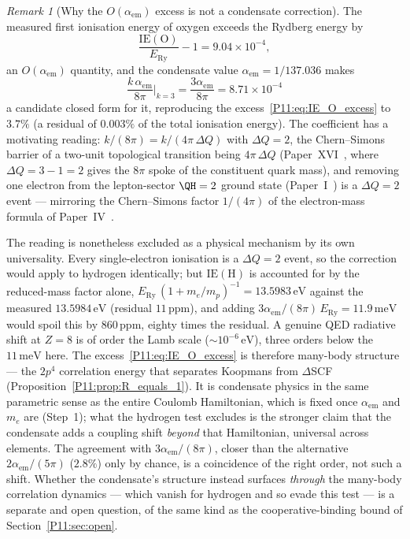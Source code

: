 \documentclass[11pt,a4paper]{article}
\theoremstyle{definition}
\theoremstyle{remark}
\newtheorem{remark}[theorem]{Remark}
\newcommand{\ERy}{E_{\mathrm{Ry}}}
\newcommand{\aem}{\alpha_{\mathrm{em}}}
\newcommand{\IE}{\mathrm{IE}}
\begin{document}
\begin{remark}[Why the $O(\aem)$ excess is not a condensate correction]
\label{P11:rem:oalpha_excess}
The measured first ionisation energy of oxygen exceeds the Rydberg
energy by
\begin{equation}
  \frac{\IE(\mathrm{O})}{\ERy} - 1 = 9.04\times10^{-4},
  \label{P11:eq:IE_O_excess}
\end{equation}
an $O(\aem)$ quantity, and the condensate value $\aem = 1/137.036$
makes
\begin{equation}
  \frac{k\,\aem}{8\pi}\bigg|_{k=3} = \frac{3\aem}{8\pi} = 8.71\times10^{-4}
  \label{P11:eq:IE_O_closed}
\end{equation}
a candidate closed form for it, reproducing the
excess~\eqref{P11:eq:IE_O_excess} to $3.7\%$ (a residual of $0.003\%$
of the total ionisation energy).  The coefficient has a motivating
reading: $k/(8\pi) = k/(4\pi\,\Delta Q)$ with $\Delta Q = 2$, the
Chern--Simons barrier of a two-unit topological transition being
$4\pi\,\Delta Q$ (Paper~XVI~\cite{Paper16}, where $\Delta Q = 3-1 = 2$
gives the $8\pi$ spoke of the constituent quark mass), and removing one
electron from the lepton-sector $\QH=2$ ground state
(Paper~I~\cite{Paper1}) is a $\Delta Q = 2$ event --- mirroring the
Chern--Simons factor $1/(4\pi)$ of the electron-mass formula of
Paper~IV~\cite{Paper4}.

The reading is nonetheless excluded as a physical mechanism by its own
universality.  Every single-electron ionisation is a $\Delta Q = 2$
event, so the correction would apply to hydrogen identically; but
$\IE(\mathrm{H})$ is accounted for by the reduced-mass factor alone,
$\ERy\,(1+m_e/m_p)^{-1} = 13.5983\,\mathrm{eV}$ against the measured
$13.5984\,\mathrm{eV}$ (residual $11\,\mathrm{ppm}$), and adding
$3\aem/(8\pi)\,\ERy = 11.9\,\mathrm{meV}$ would spoil this by
$860\,\mathrm{ppm}$, eighty times the residual.  A genuine QED
radiative shift at $Z=8$ is of order the Lamb scale
($\sim10^{-6}\,\mathrm{eV}$), three orders below the $11\,\mathrm{meV}$
here.  The excess~\eqref{P11:eq:IE_O_excess} is therefore many-body
structure --- the $2p^4$ correlation energy that separates Koopmans
from $\Delta$SCF (Proposition~\ref{P11:prop:R_equals_1}).  It is
condensate physics in the same parametric sense as the entire Coulomb
Hamiltonian, which is fixed once $\aem$ and $m_e$ are
(Step~1); what the hydrogen test excludes is the stronger claim that
the condensate adds a coupling shift \emph{beyond} that Hamiltonian,
universal across elements.  The agreement with $3\aem/(8\pi)$, closer
than the alternative $2\aem/(5\pi)$ ($2.8\%$) only by chance, is a
coincidence of the right order, not such a shift.  Whether the
condensate's structure instead surfaces \emph{through} the many-body
correlation dynamics --- which vanish for hydrogen and so evade this
test --- is a separate and open question, of the same kind as the
cooperative-binding bound of Section~\ref{P11:sec:open}.
\end{remark}
\end{document}

